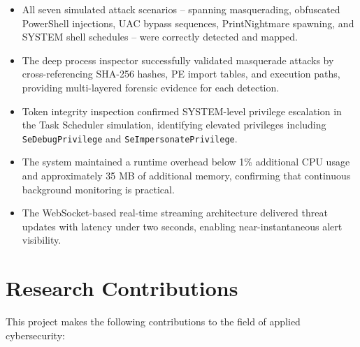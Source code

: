 \begin{itemize}
    \item All seven simulated attack scenarios -- spanning masquerading, obfuscated PowerShell injections, UAC bypass sequences, PrintNightmare spawning, and SYSTEM shell schedules -- were correctly detected and mapped.

    \item The deep process inspector successfully validated masquerade attacks by cross-referencing SHA-256 hashes, PE import tables, and execution paths, providing multi-layered forensic evidence for each detection.

    \item Token integrity inspection confirmed SYSTEM-level privilege escalation in the Task Scheduler simulation, identifying elevated privileges including \texttt{SeDebugPrivilege} and \texttt{SeImpersonatePrivilege}.

    \item The system maintained a runtime overhead below 1\% additional CPU usage and approximately 35 MB of additional memory, confirming that continuous background monitoring is practical.

    \item The WebSocket-based real-time streaming architecture delivered threat updates with latency under two seconds, enabling near-instantaneous alert visibility.
\end{itemize}

\section{Research Contributions}

This project makes the following contributions to the field of applied cybersecurity:

